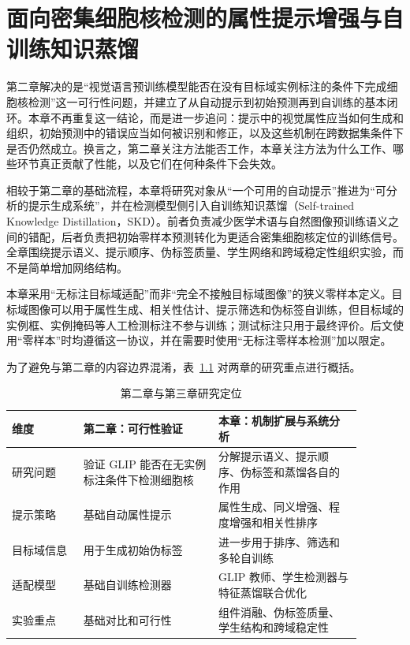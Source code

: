 \chapter{面向密集细胞核检测的属性提示增强与自训练知识蒸馏}

第二章解决的是“视觉语言预训练模型能否在没有目标域实例标注的条件下完成细胞核检测”这一可行性问题，并建立了从自动提示到初始预测再到自训练的基本闭环。本章不再重复这一结论，而是进一步追问：提示中的视觉属性应当如何生成和组织，初始预测中的错误应当如何被识别和修正，以及这些机制在跨数据集条件下是否仍然成立。换言之，第二章关注方法能否工作，本章关注方法为什么工作、哪些环节真正贡献了性能，以及它们在何种条件下会失效。

相较于第二章的基础流程，本章将研究对象从“一个可用的自动提示”推进为“可分析的提示生成系统”，并在检测模型侧引入自训练知识蒸馏（Self-trained Knowledge Distillation，SKD）。前者负责减少医学术语与自然图像预训练语义之间的错配，后者负责把初始零样本预测转化为更适合密集细胞核定位的训练信号。全章围绕提示语义、提示顺序、伪标签质量、学生网络和跨域稳定性组织实验，而不是简单增加网络结构。

本章采用“无标注目标域适配”而非“完全不接触目标域图像”的狭义零样本定义。目标域图像可以用于属性生成、相关性估计、提示筛选和伪标签自训练，但目标域的实例框、实例掩码等人工检测标注不参与训练；测试标注只用于最终评价。后文使用“零样本”时均遵循这一协议，并在需要时使用“无标注零样本检测”加以限定。

为了避免与第二章的内容边界混淆，表~\ref{tab:attrip_ch3_ch4_boundary} 对两章的研究重点进行概括。

\begin{table}[t]
\caption{第二章与第三章研究定位}
\label{tab:attrip_ch3_ch4_boundary}
\small
\begin{center}
\begin{tabular}{p{0.18\linewidth}p{0.34\linewidth}p{0.36\linewidth}}
\toprule[1.5pt]
\textbf{维度} & \textbf{第二章：可行性验证} & \textbf{本章：机制扩展与系统分析} \\ \midrule[1.2pt]
研究问题 & 验证 GLIP 能否在无实例标注条件下检测细胞核 & 分解提示语义、提示顺序、伪标签和蒸馏各自的作用 \\ 
提示策略 & 基础自动属性提示 & 属性生成、同义增强、程度增强和相关性排序 \\ 
目标域信息 & 用于生成初始伪标签 & 进一步用于排序、筛选和多轮自训练 \\ 
适配模型 & 基础自训练检测器 & GLIP 教师、学生检测器与特征蒸馏联合优化 \\ 
实验重点 & 基础对比和可行性 & 组件消融、伪标签质量、学生结构和跨域稳定性 \\ 
\bottomrule[1.5pt]
\end{tabular}
\end{center}
\end{table}

